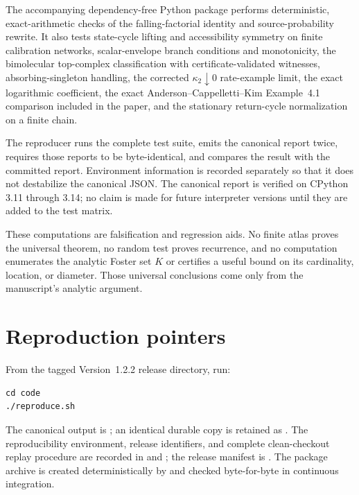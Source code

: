 \documentclass[10pt]{article}
\begin{document}
The accompanying dependency-free Python package performs deterministic,
exact-arithmetic checks of the falling-factorial identity and
source-probability rewrite.  It also tests state-cycle lifting and accessibility
symmetry on finite calibration networks, scalar-envelope branch conditions and
monotonicity, the bimolecular top-complex classification with
certificate-validated witnesses, absorbing-singleton handling, the corrected
$\kappa_2\downarrow0$ rate-example limit, the exact logarithmic coefficient,
the exact Anderson--Cappelletti--Kim Example~4.1 comparison included in the
paper, and the stationary return-cycle normalization on a finite chain.

The reproducer runs the complete test suite, emits the canonical report twice,
requires those reports to be byte-identical, and compares the result with the
committed report.  Environment information is recorded separately so that it
does not destabilize the canonical JSON.  The canonical report is verified on
CPython 3.11 through 3.14; no claim is made for future interpreter versions
until they are added to the test matrix.

These computations are falsification and regression aids.  No finite atlas
proves the universal theorem, no random test proves recurrence, and no
computation enumerates the analytic Foster set $K$ or certifies a useful bound
on its cardinality, location, or diameter.  Those universal conclusions come
only from the manuscript's analytic argument.

\section{Reproduction pointers}

From the tagged Version~1.2.2 release directory, run:

\begin{verbatim}
cd code
./reproduce.sh
\end{verbatim}

The canonical output is
; an identical durable copy is retained
as .  The reproducibility environment,
release identifiers, and complete clean-checkout replay procedure are recorded
in  and ; the release manifest is
.  The package archive is created
deterministically by  and checked
byte-for-byte in continuous integration.
\end{document}

